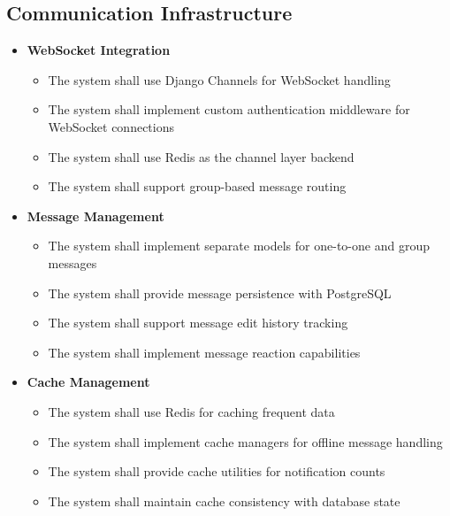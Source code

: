 \subsection{Communication Infrastructure}
\begin{itemize}
    \item \textbf{WebSocket Integration}
    \begin{itemize}
        \item The system shall use Django Channels for WebSocket handling
        \item The system shall implement custom authentication middleware for WebSocket connections
        \item The system shall use Redis as the channel layer backend
        \item The system shall support group-based message routing
    \end{itemize}
    
    \item \textbf{Message Management}
    \begin{itemize}
        \item The system shall implement separate models for one-to-one and group messages
        \item The system shall provide message persistence with PostgreSQL
        \item The system shall support message edit history tracking
        \item The system shall implement message reaction capabilities
    \end{itemize}
    
    \item \textbf{Cache Management}
    \begin{itemize}
        \item The system shall use Redis for caching frequent data
        \item The system shall implement cache managers for offline message handling
        \item The system shall provide cache utilities for notification counts
        \item The system shall maintain cache consistency with database state
    \end{itemize}
\end{itemize}

